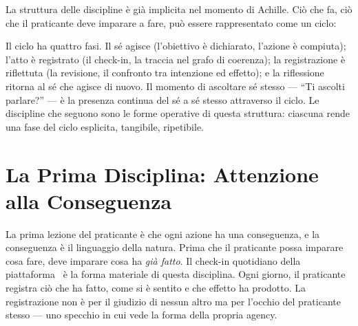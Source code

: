 La struttura delle discipline \`e gi\`a implicita nel momento di Achille.
Ci\`o che fa, ci\`o che il praticante deve imparare a fare, pu\`o essere
rappresentato come un ciclo:

\begin{center}
\end{center}

Il ciclo ha quattro fasi. Il s\'e agisce (l'obiettivo \`e dichiarato,
l'azione \`e compiuta); l'atto \`e registrato (il check-in, la traccia
nel grafo di coerenza); la registrazione \`e riflettuta (la revisione,
il confronto tra intenzione ed effetto); e la riflessione ritorna al
s\'e che agisce di nuovo. Il momento di ascoltare s\'e stesso --- ``Ti
ascolti parlare?'' --- \`e la presenza continua del s\'e a s\'e stesso
attraverso il ciclo. Le discipline che seguono sono le forme operative
di questa struttura: ciascuna rende una fase del ciclo esplicita,
tangibile, ripetibile.

\section{La Prima Disciplina: Attenzione alla Conseguenza}

La prima lezione del praticante \`e che ogni azione ha una conseguenza,
e la conseguenza \`e il linguaggio della natura. Prima che il praticante
possa imparare cosa fare, deve imparare cosa ha \emph{gi\`a fatto}. Il
check-in quotidiano della piattaforma \praxis\ \`e la forma materiale
di questa disciplina. Ogni giorno, il praticante registra ci\`o che ha
fatto, come si \`e sentito e che effetto ha prodotto. La registrazione
non \`e per il giudizio di nessun altro ma per l'occhio del praticante
stesso --- uno specchio in cui vede la forma della propria agency.

